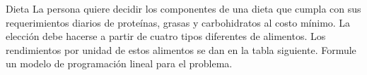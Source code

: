 \begin{frameExample}{Dieta}{}
  La persona quiere decidir los componentes de una dieta que cumpla con sus requerimientos diarios de proteínas, grasas y carbohidratos al costo mínimo. La elección debe hacerse a partir de cuatro tipos diferentes de alimentos. Los rendimientos por unidad de estos alimentos se dan en la tabla siguiente. Formule un modelo de programación lineal para el problema.
  
  {\centering
\par}

  
\end{frameExample}



